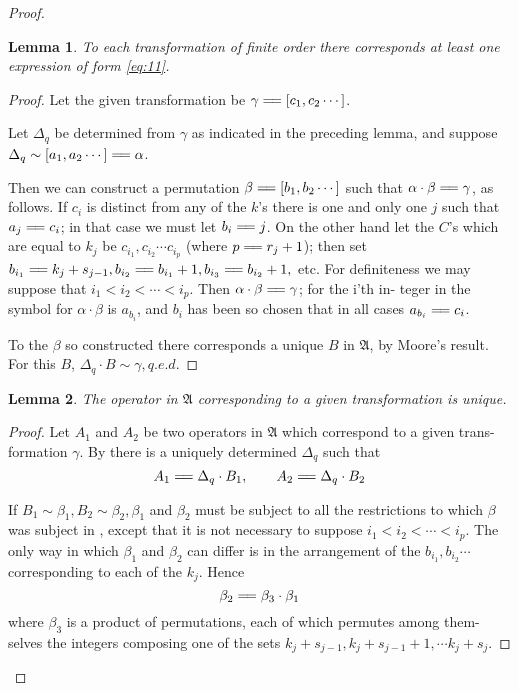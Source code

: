 \documentclass[10pt, twoside]{extarticle}
\newcommand{\td}[2][] {\todo[tickmarkheight=3pt, inline, size=\tiny, #1]{#2}}
\newcommand\longeq{=\joinrel=}
\theoremstyle{breaktheorem}
\theoremstyle{mylemma}
\newtheorem{lemma}{Lemma}
\theoremstyle{mydefinition}
\theoremstyle{mycorollary}
\begin{document}
\begin{proof}
\begin{lemma}
  \label{lemma:4}
  To each transformation of finite order there corresponds at
  least one expression of form \eqref{eq:11}.
\end{lemma}
\begin{proof}
  Let the given transformation be \(\gamma \longeq [c_1, c_2 \cdots]\).

  Let \(\Delta_q\) be determined from \(\gamma\) as indicated in the preceding lemma, and
  suppose \(\Delta_q \sim [a_1, a_2 \cdots] \longeq \alpha\).

  Then we can construct a permutation \(\beta \longeq [b_1, b_2 \cdots]\) such that
  \(\alpha \cdot \beta \longeq \gamma\), as follows. If \(c_i\) is distinct from any of the \(k\)'s there is one and
  only one \(j\) such that \(a_j \longeq c_i\); in that case we must let \(b_i \longeq j\). On the other
  hand let the \(C\)'s which are equal to \(k_j\) be \(c_{i_1}, c_{i_2} \cdots c_{i_p}\) (where \(p \longeq r_j + 1\));
  then set \(b_{i_1} \longeq k_j + s_{j-1}, b_{i_2} \longeq b_{i_1} +1, b_{i_3} \longeq b_{i_2} +1,\) etc. For definiteness
  we may suppose that \(i_1 < i_2 < \cdots < i_p\). Then \(\alpha \cdot \beta \longeq \gamma\); for the i'th in-
  teger in the symbol for \(\alpha \cdot \beta\) is \(a_{b_i}\), and \(b_i\) has been so chosen that in all
  cases \(a_{b_i} \longeq c_i\).

  To the \(\beta\) so constructed there corresponds a unique \(B\) in \(\mathfrak{A}\), by Moore's
  result. For this \(B\), \(\Delta_q \cdot B \sim \gamma, q.e.d.\)
\end{proof}

\begin{lemma}
  \label{lemma:5}
  The operator in \(\mathfrak{A}\) corresponding to a given transformation
  is unique.
\end{lemma}
\td{proof newline}
\begin{proof}
  Let \(A_1\) and \(A_2\) be two operators in \(\mathfrak{A}\) which correspond to a given trans-
  formation \(\gamma\). By  there is a uniquely determined \(\Delta_q\)
  such that
  \[A_1 \longeq \Delta_q \cdot B_1, \qquad A_2 \longeq \Delta_q \cdot B_2\]

  If \(B_1 \sim \beta_1, B_2 \sim \beta_2, \beta_1\) and \(\beta_2\) must be subject to all the restrictions
  to which \(\beta\) was subject in , except that it is not necessary to suppose
  \(i_1 < i_2 < \cdots < i_p\). The only way in which \(\beta_1\) and \(\beta_2\) can differ is in the
  arrangement of the \(b_{i_1}, b_{i_2} \cdots\) corresponding to each of the \(k_j\). Hence
  \[\beta_2 \longeq \beta_3 \cdot \beta_1\]
  where \(\beta_3\) is a product of permutations, each of which permutes among them-
  selves the integers composing one of the sets \(k_j + s_{j-1}, k_j + s_{j-1} + 1, \cdots k_j + s_j\).


\end{proof}
\end{proof}
\end{document}
